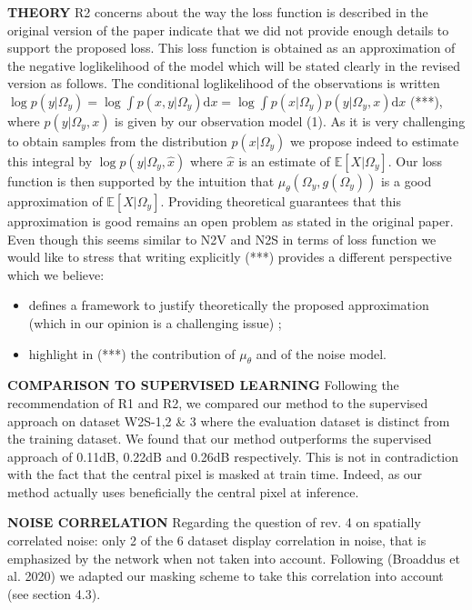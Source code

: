 \documentclass{article}
\begin{document}
\textbf{THEORY}
R2 concerns about the way the loss function is described in the original version of the paper indicate that we did not provide enough details to support the proposed loss. This loss function is obtained as an approximation of the negative loglikelihood of the model which will be stated clearly in the revised version as follows.
The conditional loglikelihood of the observations is written $ \log p(y|\Omega_y) = \log \int p(x,y|\Omega_y) \mathrm{d}x = \log \int p(x|\Omega_y)p(y|\Omega_y,x) \mathrm{d}x$ (***), where $p(y|\Omega_y,x)$ is given by our observation model (1). As it is very challenging to obtain samples from the distribution $p(x|\Omega_y)$ we propose indeed to estimate this integral by $\log p(y|\Omega_y,\hat {x})$ where $\hat {x}$ is an estimate of $\mathbb{E}[X|\Omega_y]$. Our loss function is then supported by the intuition that $\mu_\theta(\Omega_y,g(\Omega_y))$ is a good approximation of $\mathbb{E}[X|\Omega_y]$. Providing theoretical guarantees  that this approximation is good remains an open problem as stated in the original paper. Even though this seems similar to N2V and N2S in terms of loss function we would like to stress that writing explicitly (***) provides a different perspective which we believe:
\begin{itemize}
  \item defines a framework to justify theoretically the proposed approximation (which in our opinion is a challenging issue) ;
  \item highlight in (***) the contribution of $\mu_\theta$ and of the noise model.
\end{itemize}

\textbf{COMPARISON TO SUPERVISED LEARNING}
Following the recommendation of R1 and R2, we compared our method to the supervised approach on dataset W2S-1,2 \& 3 where the evaluation dataset is distinct from the training dataset. We found that our method outperforms the supervised approach of 0.11dB, 0.22dB and 0.26dB respectively. This is not in contradiction with the fact that the central pixel is masked at train time. Indeed, as our method actually uses beneficially the central pixel at inference.

\textbf{NOISE CORRELATION}
Regarding the question of rev. 4 on spatially correlated noise: only 2 of the 6 dataset display correlation in noise, that is emphasized by the network when not taken into account. Following (Broaddus et al. 2020) we adapted our masking scheme to take this correlation into account (see section 4.3).
\end{document}
